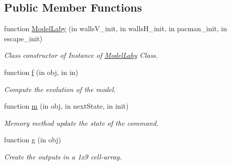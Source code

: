 \subsection*{Public Member Functions}
\begin{DoxyCompactItemize}
\item 
function \hyperlink{class_model_laby_adefbf2299bfb17336cae5508d54443a8}{Model\+Laby} (in walls\+V\+\_\+init, in walls\+H\+\_\+init, in pacman\+\_\+init, in escape\+\_\+init)
\begin{DoxyCompactList}\small\item\em Class constructor of Instance of \hyperlink{class_model_laby}{Model\+Laby} Class. \end{DoxyCompactList}\item 
function \hyperlink{class_model_laby_a6f3b146c92a207e95690d08975e1e072}{f} (in obj, in in)
\begin{DoxyCompactList}\small\item\em Compute the evolution of the model. \end{DoxyCompactList}\item 
function \hyperlink{class_model_laby_a3140f24c6c4b80037b7d4f521c6ae2d3}{m} (in obj, in next\+State, in init)
\begin{DoxyCompactList}\small\item\em Memory method update the state of the command. \end{DoxyCompactList}\item 
function \hyperlink{class_model_laby_a07dadfabe92bf9a144b8a862720e7746}{g} (in obj)
\begin{DoxyCompactList}\small\item\em Create the outputs in a 1x9 cell-\/array. \end{DoxyCompactList}\end{DoxyCompactItemize}
